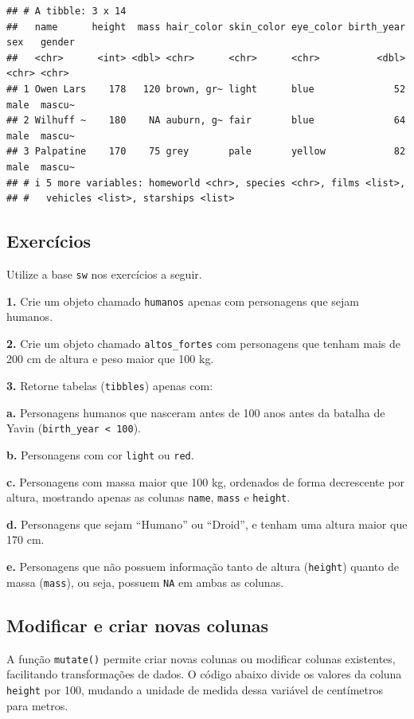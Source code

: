 \documentclass[
]{book}
\begin{document}
\begin{verbatim}
## # A tibble: 3 x 14
##   name      height  mass hair_color skin_color eye_color birth_year sex   gender
##   <chr>      <int> <dbl> <chr>      <chr>      <chr>          <dbl> <chr> <chr> 
## 1 Owen Lars    178   120 brown, gr~ light      blue              52 male  mascu~
## 2 Wilhuff ~    180    NA auburn, g~ fair       blue              64 male  mascu~
## 3 Palpatine    170    75 grey       pale       yellow            82 male  mascu~
## # i 5 more variables: homeworld <chr>, species <chr>, films <list>,
## #   vehicles <list>, starships <list>
\end{verbatim}

\subsection{Exercícios}\label{exercuxedcios-16}

Utilize a base \texttt{sw} nos exercícios a seguir.

\textbf{1.} Crie um objeto chamado \texttt{humanos} apenas com personagens que sejam
humanos.

\textbf{2.} Crie um objeto chamado \texttt{altos\_fortes} com personagens que tenham
mais de 200 cm de altura e peso maior que 100 kg.

\textbf{3.} Retorne tabelas (\texttt{tibbles}) apenas com:

\textbf{a.} Personagens humanos que nasceram antes de 100 anos antes da
batalha de Yavin (\texttt{birth\_year\ \textless{}\ 100}).

\textbf{b.} Personagens com cor \texttt{light} ou \texttt{red}.

\textbf{c.} Personagens com massa maior que 100 kg, ordenados de forma
decrescente por altura, mostrando apenas as colunas \texttt{name}, \texttt{mass} e
\texttt{height}.

\textbf{d.} Personagens que sejam ``Humano'' ou ``Droid'', e tenham uma altura
maior que 170 cm.

\textbf{e.} Personagens que não possuem informação tanto de altura (\texttt{height})
quanto de massa (\texttt{mass}), ou seja, possuem \texttt{NA} em ambas as colunas.

\subsection{Modificar e criar novas colunas}\label{modificar-e-criar-novas-colunas}

A função \texttt{mutate()} permite criar novas colunas ou modificar colunas
existentes, facilitando transformações de dados. O código abaixo divide
os valores da coluna \texttt{height} por 100, mudando a unidade de medida dessa
variável de centímetros para metros.
\end{document}
